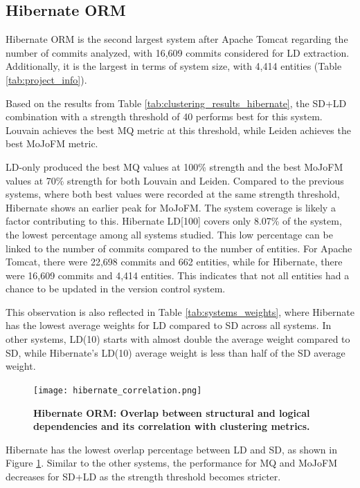 \documentclass{ieeeaccess}
\begin{document}
\subsection{Hibernate ORM}

Hibernate ORM is the second largest system after Apache Tomcat regarding the number of commits analyzed, with 16,609 commits considered for LD extraction. Additionally, it is the largest in terms of system size, with 4,414 entities (Table \ref{tab:project_info}).

Based on the results from Table \ref{tab:clustering_results_hibernate}, the SD+LD combination with a strength threshold of 40 performs best for this system. Louvain achieves the best MQ metric at this threshold, while Leiden achieves the best MoJoFM metric.

LD-only produced the best MQ values at 100\% strength and the best MoJoFM values at 70\% strength for both Louvain and Leiden. Compared to the previous systems, where both best values were recorded at the same strength threshold, Hibernate shows an earlier peak for MoJoFM. The system coverage is likely a factor contributing to this. Hibernate  LD[100] covers only 8.07\% of the system, the lowest percentage among all systems studied. This low percentage can be linked to the number of commits compared to the number of entities. For Apache Tomcat, there were 22,698 commits and 662 entities, while for Hibernate, there were 16,609 commits and 4,414 entities. This indicates that not all entities had a chance to be updated in the version control system.

This observation is also reflected in Table \ref{tab:systems_weights}, where Hibernate has the lowest average weights for LD compared to SD across all systems. In other systems, LD(10) starts with almost double the average weight compared to SD, while Hibernate's LD(10) average weight is less than half of the SD average weight.

\begin{figure}[t!]
  \centering
  \texttt{[image: hibernate\_correlation.png]}
  \caption{\textbf{Hibernate ORM: Overlap between structural and logical dependencies and its correlation with clustering metrics.}}
  \label{fig:hibernate_correlation}
\end{figure}

Hibernate has the lowest overlap percentage between LD and SD, as shown in Figure \ref{fig:hibernate_correlation}. Similar to the other systems, the performance for MQ and MoJoFM decreases for SD+LD as the strength threshold becomes stricter.
\end{document}
